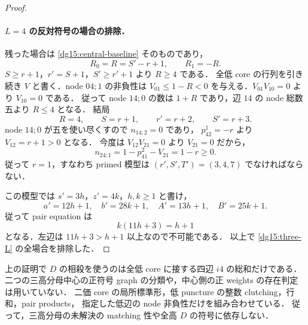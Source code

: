 \begin{proof}
\paragraph{$L=4$ の反対符号の場合の排除．}
残った場合は \eqref{dg15:central-baseline} そのものであり，
\[
 R_0=R=S'-r+1,\qquad R_1=-R.
\]
$S\geq r+1$，$r'=S+1$，$S'\geq r'+1$ より $R\geq4$ である．
全低 core の行列を引き続き $V$ と書く．node $04;1$ の非負性は
$V_{01}\leq1-R<0$ を与える．$V_{01}V_{10}=0$ より $V_{10}=0$ である．
従って node $14;0$ の数は $1+R$ であり，辺 $14$ の node 総数五より $R\leq4$ となる．
結局
\[
 R=4,\qquad S=r+1,\qquad r'=r+2,\qquad S'=r+3.
\]
node $14;0$ が五を使い尽くすので $n_{14;2}=0$ であり，
$p^1_{42}=-r$ より $V_{12}=r+1>0$ となる．
今度は $V_{12}V_{21}=0$ より $V_{21}=0$ だから，
\[
 n_{24;1}=1-p^2_{41}-V_{21}=1-r\geq0.
\]
従って $r=1$，すなわち primed 模型は $(r',S',T')=(3,4,7)$ でなければならない．

この模型では $s'=3h$，$z'=4k$，$h,k\geq1$ と書け，
\[
 a'=12h+1,\quad b'=28k+1,\quad A'=13h+1,\quad B'=25k+1.
\]
従って pair equation は
\[
 k(11h+3)=h+1
\]
となる．左辺は $11h+3>h+1$ 以上なので不可能である．
以上で \eqref{dg15:three-L} の全場合を排除した．
\end{proof}

\begin{remark}[使用した大域条件の範囲]
\label{dg15:scope}
上の証明で $D$ の相殺を使うのは全低 core に接する四辺 $i4$ の総和だけである．
二つの三高分母中心の正符号 graph の分類や，中心側の正 weights の存在判定は用いていない．
二価 core の局所標準形，低 puncture の整数 clutching，行和，pair products，
指定した低辺の node 非負性だけを組み合わせている．
従って，三高分母の未解決の matching 性や全高 $D$ の符号に依存しない．
\end{remark}

